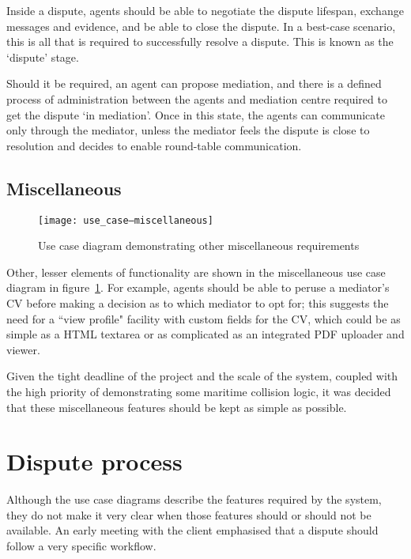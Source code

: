 Inside a dispute, agents should be able to negotiate the dispute lifespan, exchange messages and evidence, and be able to close the dispute. In a best-case scenario, this is all that is required to successfully resolve a dispute. This is known as the `dispute' stage.

Should it be required, an agent can propose mediation, and there is a defined process of administration between the agents and mediation centre required to get the dispute `in mediation'. Once in this state, the agents can communicate only through the mediator, unless the mediator feels the dispute is close to resolution and decides to enable round-table communication.

\subsection{Miscellaneous}

\begin{figure}[h!]
  \centering
    \ifimages
    \texttt{[image: use\_case--miscellaneous]}
    \fi
  \caption{Use case diagram demonstrating other miscellaneous requirements}
  \label{uml:useCase:miscellaneous}
\end{figure}

Other, lesser elements of functionality are shown in the miscellaneous use case diagram in figure~\ref{uml:useCase:miscellaneous}. For example, agents should be able to peruse a mediator's CV before making a decision as to which mediator to opt for; this suggests the need for a ``view profile" facility with custom fields for the CV, which could be as simple as a HTML textarea or as complicated as an integrated PDF uploader and viewer.

Given the tight deadline of the project and the scale of the system, coupled with the high priority of demonstrating some maritime collision logic, it was decided that these miscellaneous features should be kept as simple as possible.

\section{Dispute process}

Although the use case diagrams describe the features required by the system, they do not make it very clear when those features should or should not be available. An early meeting with the client emphasised that a dispute should follow a very specific workflow.

